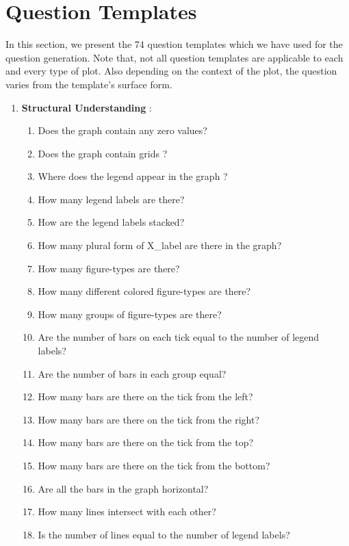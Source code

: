 \documentclass[10pt,twocolumn,letterpaper]{article}
\begin{document}
\section{Question Templates}
\label{templates}
In this section, we present the 74 question templates which we have used for the question generation. Note that, not all question templates are applicable to each and every type of plot. Also depending on the context of the plot, the question varies from the template's surface form.
\begin{enumerate}
    \item \textbf{Structural Understanding} :
    \begin{enumerate}[1.]
        \item Does the graph contain any zero values?
        \item Does the graph contain grids ?
        \item Where does the legend appear in the graph ?
        \item How many legend labels are there?
        \item How are the legend labels stacked?
        \item How many plural form of X\_label are there in the graph?
        \item How many figure-types are there?
        \item How many different colored figure-types are there?
        \item How many groups of figure-types are there?
        \item Are the number of bars on each tick equal to the number of legend labels?
        \item Are the number of bars in each group equal?
        \item How many bars are there on the  tick from the left?
        \item How many bars are there on the  tick from the right?
        \item How many bars are there on the  tick from the top?
        \item How many bars are there on the  tick from the bottom?
        \item Are all the bars in the graph horizontal?
        \item How many lines intersect with each other?
        \item Is the number of lines equal to the number of legend labels?
    \end{enumerate}
    

\end{enumerate}
\end{document}
